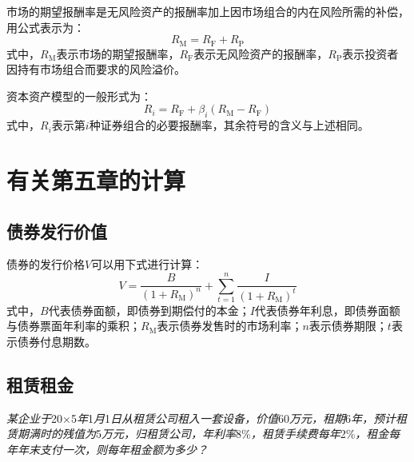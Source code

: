 \documentclass[
  10pt,
  twoside,
  openany,
  b5paper, %
  colorscheme = black, %
  xits = false,
]{qyxf-book}
\begin{document}
市场的期望报酬率是无风险资产的报酬率加上因市场组合的内在风险所需的补偿，用公式表示为：
\begin{equation*}
	R_\mathrm{M} = R_\mathrm{F} + R_\mathrm{P}
\end{equation*}
式中，$R_\mathrm{M}$表示市场的期望报酬率，$R_\mathrm{F}$表示无风险资产的报酬率，$R_\mathrm{P}$表示投资者因持有市场组合而要求的风险溢价。

资本资产模型的一般形式为：
\begin{equation*}
	R_i = R_\mathrm{F} + \beta_i (R_\mathrm{M} - R_\mathrm{F})
\end{equation*}
式中，$R_i$表示第$i$种证券组合的必要报酬率，其余符号的含义与上述相同。

\newpage

\section{有关第五章的计算}
\subsection{债券发行价值}


债券的发行价格$V$可以用下式进行计算：
\begin{equation*}
	V = \frac{B}{(1+R_\mathrm{M})^n}+\sum_{t=1}^{n}\frac{I}{(1+R_\mathrm{M})^t}
\end{equation*}
式中，$B$代表债券面额，即债券到期偿付的本金；$I$代表债券年利息，即债券面额与债券票面年利率的乘积；$R_\mathrm{M}$表示债券发售时的市场利率；$n$表示债券期限；$t$表示债券付息期数。

\subsection{租赁租金}

\emph{某企业于}20×5\emph{年}1\emph{月}1\emph{日}\emph{从租赁公司租入一套设备，价值}60\emph{万元，租期}6\emph{年，预计租赁期满时的残值为}5\emph{万元，归租赁公司，年利率}8\%\emph{，租赁手续费每年}2\%\emph{，租金每年年末支付一次，则每年租金额为多少？}
\end{document}
